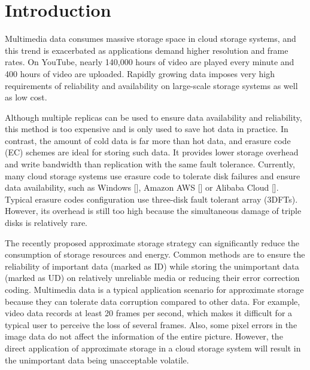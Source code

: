 \documentclass[sigconf]{acmart}
\begin{document}
%
%

\maketitle

\section{Introduction}
Multimedia data consumes massive storage space in cloud storage systems, and this trend is exacerbated as applications demand higher resolution and frame rates. On YouTube, nearly 140,000 hours of video are played every minute and 400 hours of video are uploaded. Rapidly growing data imposes very high requirements of reliability and availability on large-scale storage systems as well as low cost.

Although multiple replicas can be used to ensure data availability and reliability, this method is too expensive and is only used to save hot data in practice. In contrast, the amount of cold data is far more than hot data, and erasure code (EC) schemes are ideal for storing such data. It provides lower storage overhead and write bandwidth than replication with the same fault tolerance. Currently, many cloud storage systems use erasure code to tolerate disk failures and ensure data availability, such as Windows [], Amazon AWS [] or Alibaba Cloud []. Typical erasure codes configuration use three-disk fault tolerant array (3DFTs). However, its overhead is still too high because the simultaneous damage of triple disks is relatively rare. 

The recently proposed approximate storage strategy can significantly reduce the consumption of storage resources and energy. Common methods are to ensure the reliability of important data (marked as ID) while storing the unimportant data (marked as UD) on relatively unreliable media or reducing their error correction coding. Multimedia data is a typical application scenario for approximate storage because they can tolerate data corruption compared to other data. For example, video data records at least 20 frames per second, which makes it difficult for a typical user to perceive the loss of several frames. Also, some pixel errors in the image data do not affect the information of the entire picture. However, the direct application of approximate storage in a cloud storage system will result in the unimportant data being unacceptable volatile.
\end{document}
